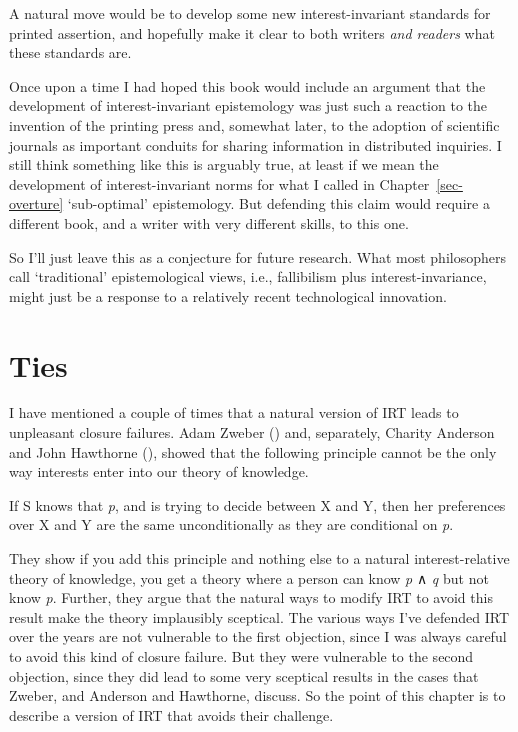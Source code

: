 \documentclass[
  10pt,
  letterpaper,
  twoside]{scrbook}
\providecommand{\tightlist}{%
  \setlength{\itemsep}{0pt}\setlength{\parskip}{0pt}}\usepackage{longtable,booktabs,array}
\begin{document}
A natural move would be to develop some new interest-invariant standards
for printed assertion, and hopefully make it clear to both writers
\emph{and readers} what these standards are.

Once upon a time I had hoped this book would include an argument that
the development of interest-invariant epistemology was just such a
reaction to the invention of the printing press and, somewhat later, to
the adoption of scientific journals as important conduits for sharing
information in distributed inquiries. I still think something like this
is arguably true, at least if we mean the development of
interest-invariant norms for what I called in Chapter~\ref{sec-overture}
`sub-optimal' epistemology. But defending this claim would require a
different book, and a writer with very different skills, to this one.

So I'll just leave this as a conjecture for future research. What most
philosophers call `traditional' epistemological views, i.e., fallibilism
plus interest-invariance, might just be a response to a relatively
recent technological innovation.


\chapter{Ties}\label{sec-ties}

I have mentioned a couple of times that a natural version of IRT leads
to unpleasant closure failures. Adam Zweber
() and, separately, Charity Anderson and
John Hawthorne (), showed
that the following principle cannot be the only way interests enter into
our theory of knowledge.

\begin{description}
\tightlist
\item[Conditional Preferences]
If S knows that \emph{p}, and is trying to decide between X and Y, then
her preferences over X and Y are the same unconditionally as they are
conditional on \emph{p}.
\end{description}

They show if you add this principle and nothing else to a natural
interest-relative theory of knowledge, you get a theory where a person
can know \emph{p} ∧ \emph{q} but not know \emph{p}. Further, they argue
that the natural ways to modify IRT to avoid this result make the theory
implausibly sceptical. The various ways I've defended IRT over the years
are not vulnerable to the first objection, since I was always careful to
avoid this kind of closure failure. But they were vulnerable to the
second objection, since they did lead to some very sceptical results in
the cases that Zweber, and Anderson and Hawthorne, discuss. So the point
of this chapter is to describe a version of IRT that avoids their
challenge.
\end{document}
